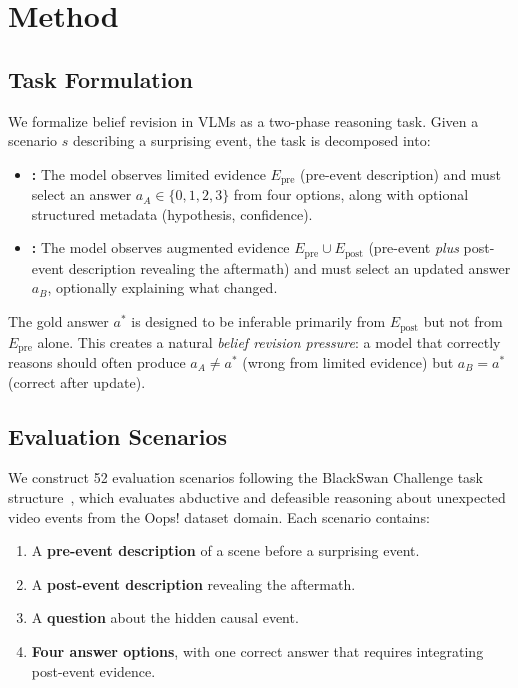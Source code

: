 \section{Method}
\label{sec:method}

\subsection{Task Formulation}
\label{sec:task}

We formalize belief revision in VLMs as a two-phase reasoning task.  Given a scenario $s$ describing a surprising event, the task is decomposed into:

\begin{itemize}[leftmargin=*, nosep]
    \item \textbf{\phaseA:} The model observes limited evidence $E_{\text{pre}}$ (pre-event description) and must select an answer $a_A \in \{0,1,2,3\}$ from four options, along with optional structured metadata (hypothesis, confidence).
    \item \textbf{\phaseB:} The model observes augmented evidence $E_{\text{pre}} \cup E_{\text{post}}$ (pre-event \emph{plus} post-event description revealing the aftermath) and must select an updated answer $a_B$, optionally explaining what changed.
\end{itemize}

The gold answer $a^*$ is designed to be inferable primarily from $E_{\text{post}}$ but not from $E_{\text{pre}}$ alone.  This creates a natural \emph{belief revision pressure}: a model that correctly reasons should often produce $a_A \neq a^*$ (wrong from limited evidence) but $a_B = a^*$ (correct after update).

\subsection{Evaluation Scenarios}
\label{sec:scenarios}

We construct 52 evaluation scenarios following the BlackSwan Challenge task structure~\cite{chinchure2025blackswan}, which evaluates abductive and defeasible reasoning about unexpected video events from the Oops! dataset domain.  Each scenario contains:

\begin{enumerate}[leftmargin=*, nosep]
    \item A \textbf{pre-event description} of a scene before a surprising event.
    \item A \textbf{post-event description} revealing the aftermath.
    \item A \textbf{question} about the hidden causal event.
    \item \textbf{Four answer options}, with one correct answer that requires integrating post-event evidence.
\end{enumerate}

